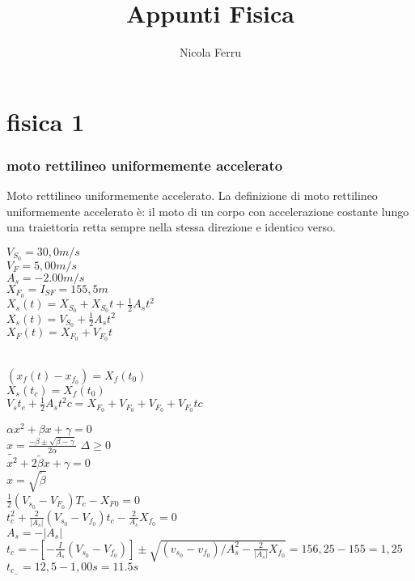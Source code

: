 \documentclass{book}
\title{Appunti Fisica}
\author{Nicola Ferru}
\date{}
\begin{document}
\maketitle
\tableofcontents
\part{fisica 1}
\section{moto rettilineo uniformemente accelerato}
Moto rettilineo uniformemente accelerato. La definizione di moto rettilineo uniformemente accelerato è: il moto di un corpo con accelerazione costante lungo una traiettoria retta sempre nella stessa direzione e identico verso.
\begin{multicols}{3} 
$V_{S_0}=30,0m/s$\\
$V_F=5,00m/s$\\
$A_s=-2.00m/s$\\
$X_{F_0}=I_{SF}=155,5m$\\
$X_s(t)=X_{S_0}+X_{S_0}t+\frac{1}{2}A_st^2$\\
$X_s(t)=V_{S_0}+\frac{1}{2}A_st^2$\\
$X_F(t)=X_{F_0}+V_{F_0}t$
\end{multicols}
\begin{multicols}{2} 
\\
  $(x_f(t)-x_{f_0})=X_{f}(t_0)$\\
  $X_s(t_c)=X_f(t_0)$\\
  $V_st_e+\frac{1}{2}A_st^2c=X_{F_0}+V_{F_0}+V_{F_0}+V_{F_0}tc$
\end{multicols}
$\alpha{x^2}+\beta{x}+\gamma=0$\\
$x=\frac{-\beta\pm\sqrt{\beta-\gamma}}{2\alpha}$ $\Delta\geq 0$\\
$\tilde{x^2}+\tilde{2\beta x}+\gamma=0$\\
$x=\sqrt{\tilde{\beta}}$\\
$\frac{1}{2}(V_{s_0}-V_{F_0})T_c-X_{F0}=0$\\
$t^2_c+\frac{2}{|A_s|}(V_{s_0}-V_{f_0})t_c-\frac{2}{A_s}X_{f_0}=0$\\
$A_s=-|A_s|$\\
$t_c=-[-\frac{I}{A_s}(V_{s_0}-V_{f_0})]\pm\sqrt{(v_{s_0}-v_{f_0})/A^2_s-\frac{2}{|A_s|}X_{f_0}}=156,25-155=1,25$\\
$t_{c_-}=12,5-1,00s=11.5s$
\end{document}
